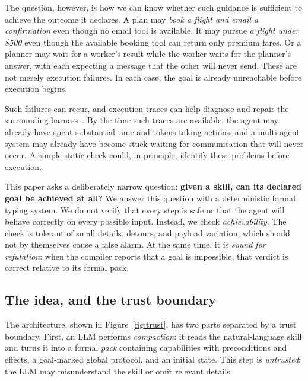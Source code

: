 \documentclass{article}
\theoremstyle{plain}
\theoremstyle{definition}
\begin{document}
The question, however, is how we can know whether such guidance is sufficient to achieve the outcome it declares. A plan may \emph{book a flight and email a confirmation} even though no email tool is available. It may pursue \emph{a flight under \$500} even though the available booking tool can return only premium fares. Or a planner may wait for a worker's result while the worker waits for the planner's answer, with each expecting a message that the other will never send. These are not merely execution failures. In each case, the goal is already unreachable before execution begins.

Such failures can recur, and execution traces can help diagnose and repair the surrounding harness~\cite{harnessfix}. By the time such traces are available, the agent may already have spent substantial time and tokens taking actions, and a multi-agent system may already have become stuck waiting for communication that will never occur. A simple static check could, in principle, identify these problems before execution.

This paper asks a deliberately narrow question: \textbf{given a skill, can its
declared goal be achieved at all?} We answer this question with a deterministic
formal typing system. We do not verify that every step is safe or that the agent
will behave correctly on every possible input. Instead, we check
\emph{achievability}. The check is tolerant of small details, detours, and
payload variation, which should not by themselves cause a false alarm. At the
same time, it is \emph{sound for refutation}: when the compiler reports that a
goal is impossible, that verdict is correct relative to its formal pack.


\subsection{The idea, and the trust boundary}

The architecture, shown in Figure~\ref{fig:trust}, has two parts separated by a trust boundary. First, an LLM performs \emph{compaction}: it reads the natural-language skill and turns it into a formal \emph{pack} containing capabilities with preconditions and effects, a goal-marked global protocol, and an initial state. This step is \emph{untrusted}: the LLM may misunderstand the skill or omit relevant details.
\end{document}
